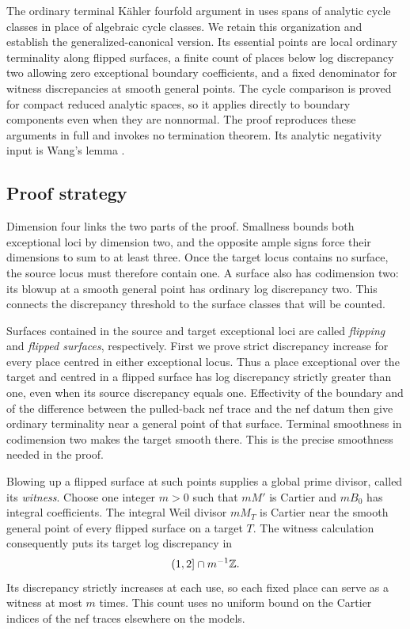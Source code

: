 The ordinary terminal K\"ahler fourfold argument in
\cite[Section~4]{OrdinaryKahler} uses spans of analytic cycle classes
in place of algebraic cycle classes. We retain this organization and
establish the generalized-canonical version. Its essential points are
local ordinary terminality along flipped surfaces, a finite count of
places below log discrepancy two allowing zero exceptional boundary
coefficients, and a fixed denominator for witness discrepancies at
smooth general points. The cycle comparison is proved for compact
reduced analytic spaces, so it applies directly to boundary components
even when they are nonnormal. The proof reproduces these arguments
in full and invokes no termination theorem. Its analytic negativity
input is Wang's lemma \cite[Lemma~1.3 and Appendices~A--B]{Wang2021}.

\subsection{Proof strategy}

Dimension four links the two parts of the proof. Smallness bounds both
exceptional loci by dimension two, and the opposite ample signs force
their dimensions to sum to at least three. Once the target locus
contains no surface, the source locus must therefore contain one.
A surface also has codimension two: its blowup at a smooth general
point has ordinary log discrepancy two. This connects the discrepancy
threshold to the surface classes that will be counted.

Surfaces contained in the source and target exceptional loci are
called \emph{flipping} and \emph{flipped surfaces}, respectively.
First we prove strict discrepancy increase for every place centred
in either exceptional locus. Thus a place exceptional over the target
and centred in a flipped surface has log discrepancy strictly greater
than one, even when its source discrepancy equals one. Effectivity of
the boundary and of the difference between the pulled-back nef trace
and the nef datum then give ordinary terminality near a general point
of that surface. Terminal smoothness in codimension two makes the
target smooth there. This is the precise smoothness needed in the proof.

Blowing up a flipped surface at such points supplies a global prime
divisor, called its \emph{witness}. Choose one integer $m>0$ such that
$mM'$ is Cartier and $mB_0$ has integral coefficients. The integral
Weil divisor $mM_T$ is Cartier near the smooth general point of every
flipped surface on a target $T$. The witness calculation consequently
puts its target log discrepancy in
\[
 (1,2]\cap m^{-1}\mathbb Z.
\]
Its discrepancy strictly increases at each use, so each fixed place
can serve as a witness at most $m$ times. This count uses no uniform
bound on the Cartier indices of the nef traces elsewhere on the models.

